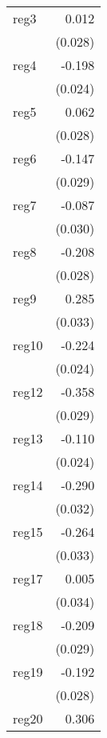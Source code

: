 {\begin{longtable}{l*{1}{D{.}{.}{-1}}}
\addlinespace
reg3        &       0.012         \\
            &     (0.028)         \\
\addlinespace
reg4        &      -0.198\sym{***}\\
            &     (0.024)         \\
\addlinespace
reg5        &       0.062\sym{*}  \\
            &     (0.028)         \\
\addlinespace
reg6        &      -0.147\sym{***}\\
            &     (0.029)         \\
\addlinespace
reg7        &      -0.087\sym{**} \\
            &     (0.030)         \\
\addlinespace
reg8        &      -0.208\sym{***}\\
            &     (0.028)         \\
\addlinespace
reg9        &       0.285\sym{***}\\
            &     (0.033)         \\
\addlinespace
reg10       &      -0.224\sym{***}\\
            &     (0.024)         \\
\addlinespace
reg12       &      -0.358\sym{***}\\
            &     (0.029)         \\
\addlinespace
reg13       &      -0.110\sym{***}\\
            &     (0.024)         \\
\addlinespace
reg14       &      -0.290\sym{***}\\
            &     (0.032)         \\
\addlinespace
reg15       &      -0.264\sym{***}\\
            &     (0.033)         \\
\addlinespace
reg17       &       0.005         \\
            &     (0.034)         \\
\addlinespace
reg18       &      -0.209\sym{***}\\
            &     (0.029)         \\
\addlinespace
reg19       &      -0.192\sym{***}\\
            &     (0.028)         \\
\addlinespace
reg20       &       0.306\sym{***}\\

\end{longtable}}
